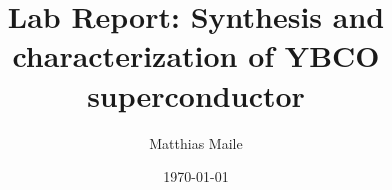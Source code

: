 \documentclass[%
 reprint,
 amsmath,amssymb,
 aps,
]{revtex4-2}
\begin{document}
\title{Lab Report: Synthesis and characterization of YBCO superconductor}%

\author{Matthias Maile}

\date{\today}%


\maketitle

\tableofcontents







\appendix



\nocite{*}

\end{document}
